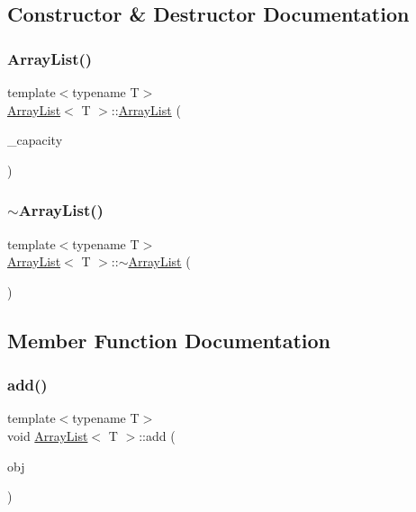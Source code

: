 \subsection{Constructor \& Destructor Documentation}
\mbox{\label{classArrayList_a326c25843211d91c735f53a6ad4a704e}} 
\subsubsection{\texorpdfstring{Array\+List()}{ArrayList()}}
{\footnotesize\ttfamily template$<$typename T$>$ \\
\hyperlink{classArrayList}{Array\+List}$<$ T $>$\+::\hyperlink{classArrayList}{Array\+List} (\begin{DoxyParamCaption}\item[{const int}]{\+\_\+capacity }\end{DoxyParamCaption})\hspace{0.3cm}{\ttfamily [inline]}}

\mbox{\label{classArrayList_a4af637822f64b61267b1e0ed4d4fca33}} 
\subsubsection{\texorpdfstring{$\sim$\+Array\+List()}{~ArrayList()}}
{\footnotesize\ttfamily template$<$typename T$>$ \\
\hyperlink{classArrayList}{Array\+List}$<$ T $>$\+::$\sim$\hyperlink{classArrayList}{Array\+List} (\begin{DoxyParamCaption}{ }\end{DoxyParamCaption})\hspace{0.3cm}{\ttfamily [inline]}}



\subsection{Member Function Documentation}
\mbox{\label{classArrayList_a7f73aec2db182b891665e95917e69000}} 
\subsubsection{\texorpdfstring{add()}{add()}}
{\footnotesize\ttfamily template$<$typename T$>$ \\
void \hyperlink{classArrayList}{Array\+List}$<$ T $>$\+::add (\begin{DoxyParamCaption}\item[{T $\ast$const}]{obj }\end{DoxyParamCaption})\hspace{0.3cm}{\ttfamily [inline]}}

